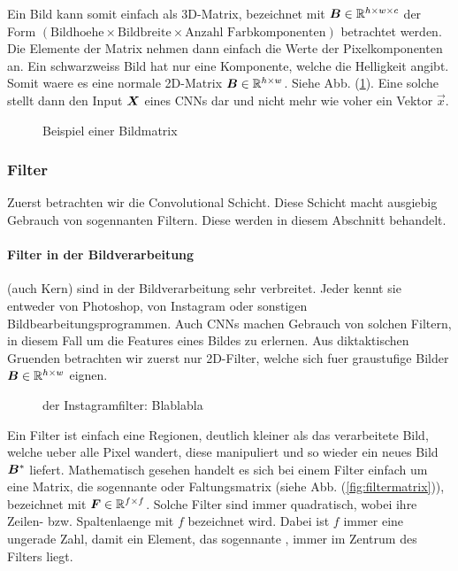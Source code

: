 \documentclass[../main]{subfiles}
\begin{document}
\para{}
Ein Bild kann somit einfach als 3D-Matrix, bezeichnet mit $\mat{B} \in \set{R}^{h \times w
  \times c}$ der Form $(\text{Bildhoehe} \times
\text{Bildbreite} \times \text{Anzahl Farbkomponenten})$ betrachtet werden. Die
Elemente der Matrix nehmen dann einfach die Werte der Pixelkomponenten an.
Ein schwarzweiss Bild hat nur eine Komponente, welche die Helligkeit angibt.
Somit waere es eine normale 2D-Matrix $\mat{B} \in \set{R}^{h \times w}$.
Siehe Abb. (\ref{fig:bildmatrix}).
\para{}
Eine solche  stellt dann den Input $\mat{X}$ eines CNNs dar und nicht mehr wie
voher ein Vektor $\vec{x}$.


\begin{figure}[h!]
  \begin{tikzpicture}

  \end{tikzpicture}
  \caption{Beispiel einer Bildmatrix}
  \label{fig:bildmatrix}
\end{figure}

\subsubsection{Filter}
Zuerst betrachten wir die Convolutional Schicht. Diese Schicht macht ausgiebig
Gebrauch von sogennanten Filtern. Diese werden in diesem Abschnitt behandelt.
\paragraph{Filter in der Bildverarbeitung}
 (auch Kern) sind in der Bildverarbeitung sehr verbreitet. Jeder kennt sie entweder
von Photoshop, von Instagram oder sonstigen Bildbearbeitungsprogrammen.
Auch CNNs machen Gebrauch von solchen Filtern, in diesem Fall um die Features eines Bildes zu
erlernen. Aus diktaktischen Gruenden betrachten wir zuerst nur 2D-Filter, welche sich fuer graustufige
Bilder $\mat{B} \in \set{R}^{h \times w}$ eignen.
\begin{figure}[h!]

  \caption{der Instagramfilter: Blablabla}
\end{figure}

\para{}
Ein Filter ist einfach eine Regionen, deutlich kleiner als das verarbeitete Bild, welche
ueber alle Pixel wandert, diese manipuliert und so wieder ein neues Bild
$\mat{B}^*$ liefert.
Mathematisch gesehen handelt es sich bei einem Filter einfach um eine Matrix,
die sogennante  oder Faltungsmatrix (siehe Abb. (\ref{fig:filtermatrix})),
bezeichnet mit $\mat{F} \in \set{R}^{f \times f}$. Solche Filter sind immer quadratisch,
wobei ihre Zeilen- bzw. Spaltenlaenge mit $f$ bezeichnet wird. Dabei ist $f$
immer eine ungerade Zahl, damit ein Element, das sogennante , immer im Zentrum des Filters liegt.
\end{document}
